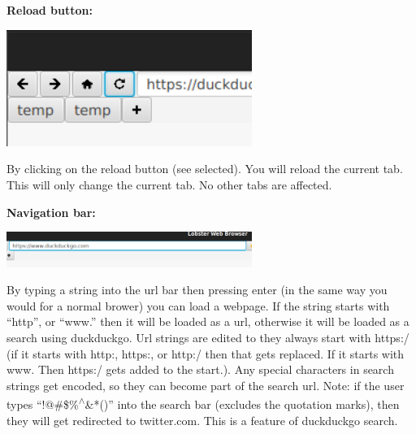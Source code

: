 \documentclass[10pt,a4paper]{report}
\begin{document}
	
	\LARGE \noindent \justifying \textbf{Reload button:} \par
	\noindent \includegraphics[width=80mm]{images/reload.png} \par
	\normalsize \noindent By clicking on the reload button (see selected). You will reload the current tab. This will only change the current tab. No other tabs are affected. \par
	
	
	\LARGE \noindent \justifying \textbf{Navigation bar:} \par
	\noindent \includegraphics[width=80mm]{images/url.png} \par
	\normalsize \noindent By typing a string into the url bar then pressing enter (in the same way you would for a normal brower) you can load a webpage. If the string starts with “http”, or “www.” then it will be loaded as a url, otherwise it will be loaded as a search using duckduckgo. Url strings are edited to they always start with https:/ (if it starts with http:, https:, or http:/ then that gets replaced. If it starts with www. Then https:/ gets added to the start.). Any special characters in search strings get encoded, so they can become part of the search url.
	Note: if the user types “!@\#\$\%\textsuperscript{$\wedge$}\&*()” into the search bar (excludes the quotation marks), then they will get redirected to twitter.com. This is a feature of duckduckgo search. \par
	 
\end{document}
